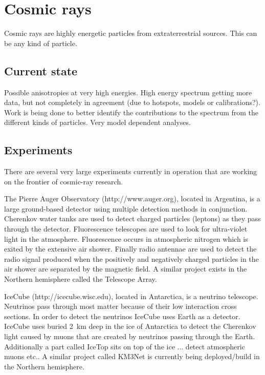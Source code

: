 \chapter{Cosmic rays}
\label{ch:cosmic-rays}

Cosmic rays are highly energetic particles from extraterrestrial sources.
This can be any kind of particle.


\section{Current state}

Possible anisotropies at very high energies. High energy spectrum
getting more data, but not completely in agreement (due to hotspots,
models or calibrations?). Work is being done to better identify the
contributions to the spectrum from the different kinds of particles.
Very model dependent analyses.


\section{Experiments}

There are several very large experiments currently in operation that are
working on the frontier of cosmic-ray research.

The Pierre Auger Observatory (http://www.auger.org), located in
Argentina, is a large ground-based detector using multiple detection
methods in conjunction. Cherenkov water tanks are used to detect charged
particles (leptons) as they pass through the detector. Fluorescence
telescopes are used to look for ultra-violet light in the atmosphere.
Fluorescence occurs in atmospheric nitrogen which is exited by the 
extensive air shower. Finally radio antennae are used to detect the
radio signal produced when the positively and negatively charged
particles in the air shower are separated by the magnetic field. A
similar project exists in the Northern hemisphere called the Telescope
Array.

IceCube (http://icecube.wisc.edu), located in Antarctica, is a neutrino
telescope. Neutrinos pass through most matter because of their low
interaction cross sections. In order to detect the neutrinos IceCube
uses Earth as a detector. IceCube uses \pmts buried \SI{2}{\kilo\meter}
deep in the ice of Antarctica to detect the Cherenkov light caused by
muons that are created by neutrinos passing through the Earth.
Additionally a part called IceTop sits on top of the ice ... detect
atmospheric muons etc.. A similar project called KM3Net is currently
being deployed/build in the Northern hemisphere.

